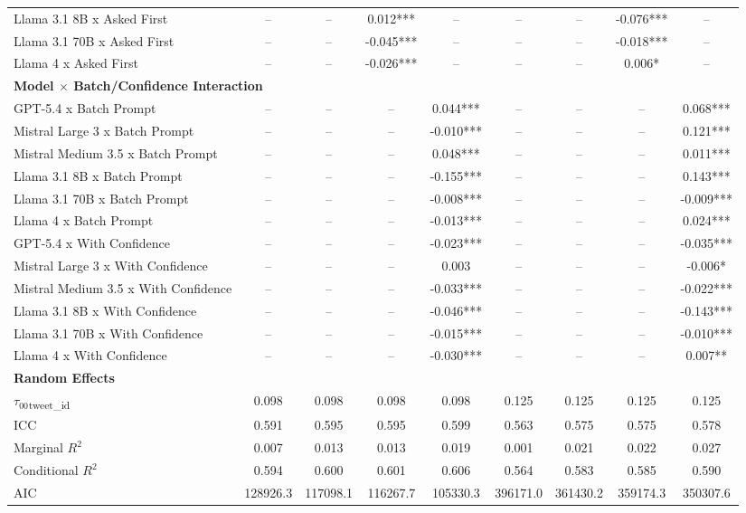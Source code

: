 \documentclass{article}
\begin{document}
\begin{table}
{\begin{tabular}{lcccccccc}
Llama 3.1 8B x Asked First & -- & -- & 0.012*** & -- & -- & -- & -0.076*** & -- \\
Llama 3.1 70B x Asked First & -- & -- & -0.045*** & -- & -- & -- & -0.018*** & -- \\
Llama 4 x Asked First & -- & -- & -0.026*** & -- & -- & -- & 0.006* & -- \\
\multicolumn{9}{l}{\textbf{Model $\times$ Batch/Confidence Interaction}} \\
GPT-5.4 x Batch Prompt & -- & -- & -- & 0.044*** & -- & -- & -- & 0.068*** \\
Mistral Large 3 x Batch Prompt & -- & -- & -- & -0.010*** & -- & -- & -- & 0.121*** \\
Mistral Medium 3.5 x Batch Prompt & -- & -- & -- & 0.048*** & -- & -- & -- & 0.011*** \\
Llama 3.1 8B x Batch Prompt & -- & -- & -- & -0.155*** & -- & -- & -- & 0.143*** \\
Llama 3.1 70B x Batch Prompt & -- & -- & -- & -0.008*** & -- & -- & -- & -0.009*** \\
Llama 4 x Batch Prompt & -- & -- & -- & -0.013*** & -- & -- & -- & 0.024*** \\
GPT-5.4 x With Confidence & -- & -- & -- & -0.023*** & -- & -- & -- & -0.035*** \\
Mistral Large 3 x With Confidence & -- & -- & -- & 0.003 & -- & -- & -- & -0.006* \\
Mistral Medium 3.5 x With Confidence & -- & -- & -- & -0.033*** & -- & -- & -- & -0.022*** \\
Llama 3.1 8B x With Confidence & -- & -- & -- & -0.046*** & -- & -- & -- & -0.143*** \\
Llama 3.1 70B x With Confidence & -- & -- & -- & -0.015*** & -- & -- & -- & -0.010*** \\
Llama 4 x With Confidence & -- & -- & -- & -0.030*** & -- & -- & -- & 0.007** \\
\multicolumn{9}{l}{\textbf{Random Effects}} \\
$\tau_{00}$\textsubscript{tweet\_id} & 0.098 & 0.098 & 0.098 & 0.098 & 0.125 & 0.125 & 0.125 & 0.125 \\
\midrule
ICC & 0.591 & 0.595 & 0.595 & 0.599 & 0.563 & 0.575 & 0.575 & 0.578 \\
Marginal $R^2$ & 0.007 & 0.013 & 0.013 & 0.019 & 0.001 & 0.021 & 0.022 & 0.027 \\
Conditional $R^2$ & 0.594 & 0.600 & 0.601 & 0.606 & 0.564 & 0.583 & 0.585 & 0.590 \\
AIC & 128926.3 & 117098.1 & 116267.7 & 105330.3 & 396171.0 & 361430.2 & 359174.3 & 350307.6 \\

\end{tabular}}
\end{table}
\end{document}
